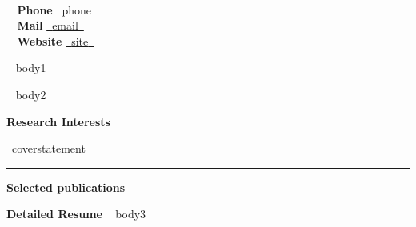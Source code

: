 \documentclass[a4paper]{article}
\newcommand{\block}[1]{\hrule \vspace{0.2cm} \textbf{\Large #1} \vspace{0.2cm}}
\newcommand{\blockNp}[1]{\newpage \textbf{\Large #1} \vspace{0.2cm}}
\newcommand{\skill}[2]{\textbf{#1} \hfill #2 \\}
\begin{document}
\begin{minipage}[c]{0.6\columnwidth}
    \\
\end{minipage} 
\hfill
\begin{minipage}[t]{0.375\columnwidth}
    \skill{\faPhone~ Phone}{~{{phone}}~}
    \skill{\faEnvelope~ Mail}{\href{mailto:~{{email}}~}{~{{email}}~}}
    \skill{\faGlobe~ Website}{\href{~{{site}}~}{~{{site}}~}}
\end{minipage}
\vspace{-0.25em}

\begin{minipage}[t]{0.6\columnwidth}
    ~{{ body1 }}~
\end{minipage} 
\hfill
\begin{minipage}[t]{0.375\columnwidth}
    ~{{ body2 }}~
\end{minipage}

\blockNp{Research Interests}

{~{{coverstatement}}~}

\vspace{0.3cm}



\block{Selected publications}
\nocite{Blacker2022,Miti2022,Miti2019,Miti2019a}
\printbibliography[heading=none]
\vspace{.5em}

\blockNp{Detailed Resume}
~{{ body3 }}~
\end{document}
